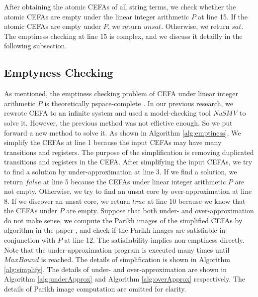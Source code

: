 \documentclass[runningheads]{llncs}
\begin{document}
After obtaining the atomic CEFAs of all string terms, we check whether the atomic CEFAs are empty under the linear integer arithmetic $P$ at line 15. If the atomic CEFAs are empty under $P$, we return $unsat$. Otherwise, we return $sat$. The emptiness checking at line 15 is complex, and we discuss it detailly in the following subsection.\newline


\subsection{Emptyness Checking}
As mentioned, the emptiness checking problem of CEFA under linear integer arithmetic $P$ is theoretically pspace-complete \cite{atva2020}. In our previous research, we rewrote CEFA to an infinite system and used a model-checking tool \emph{NuSMV} to solve it. However, the previous method was not effictive enough. So we put forward a new method to solve it.\newline
As shown in Algorithm \ref{alg:emptiness}, We simplify the CEFAs at line 1 because the input CEFAs may have many transitions and registers. The purpose of the simplification is removing duplicated transitions and registers in the CEFA. After simplifying the input CEFAs, we try to find a solution by under-approximation at line 3. If we find a solution, we return $false$ at line 5 because the CEFAs under linear integer arithmetic $P$ are not empty. Otherwise, we try to find an unsat core by over-approximation at line 8.  If we discover an unsat core,  
we return $true$ at line 10 because we know that the CEFAs under $P$ are empty. Suppose that both under- and over-approximation do not make sense, we compute the Parikh images of the simplified CEFAs by algorithm in the paper \cite{parikh_2005}, and check if the Parikh images are satisfiable in conjunction with $P$ at line 12. The satisfiability implies non-emptiness directly. \newline
Note that the under-approximation program is executed many times until $MaxBound$ is reached. The details of simplification is shown in Algorithm \ref{alg:simplify}. The details of under- and over-approximation are shown in Algorithm \ref{alg:underApprox} and Algorithm \ref{alg:overApprox} respectively. The details of Parikh image computation are omitted for clarity.\newline
\end{document}
